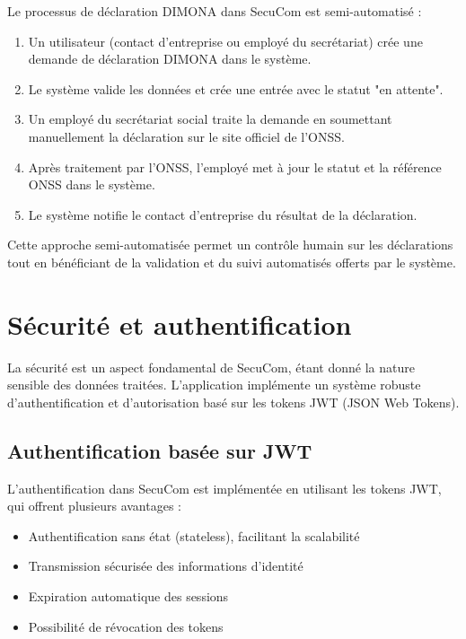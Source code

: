 Le processus de déclaration DIMONA dans SecuCom est semi-automatisé :

\begin{enumerate}
  \item Un utilisateur (contact d'entreprise ou employé du secrétariat) crée une demande de déclaration DIMONA dans le système.
  \item Le système valide les données et crée une entrée avec le statut "en attente".
  \item Un employé du secrétariat social traite la demande en soumettant manuellement la déclaration sur le site officiel de l'ONSS.
  \item Après traitement par l'ONSS, l'employé met à jour le statut et la référence ONSS dans le système.
  \item Le système notifie le contact d'entreprise du résultat de la déclaration.
\end{enumerate}

Cette approche semi-automatisée permet un contrôle humain sur les déclarations tout en bénéficiant de la validation et du suivi automatisés offerts par le système.

\section{Sécurité et authentification}

La sécurité est un aspect fondamental de SecuCom, étant donné la nature sensible des données traitées. L'application implémente un système robuste d'authentification et d'autorisation basé sur les tokens JWT (JSON Web Tokens).

\subsection{Authentification basée sur JWT}

L'authentification dans SecuCom est implémentée en utilisant les tokens JWT, qui offrent plusieurs avantages :
\begin{itemize}
  \item Authentification sans état (stateless), facilitant la scalabilité
  \item Transmission sécurisée des informations d'identité
  \item Expiration automatique des sessions
  \item Possibilité de révocation des tokens
\end{itemize}

